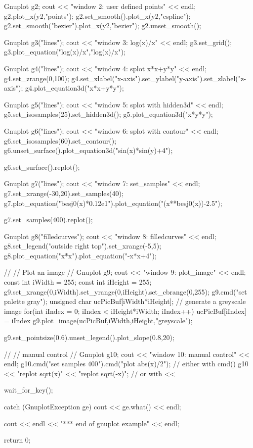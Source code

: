 \begin{DoxyCode}
{{        Gnuplot g2;
        cout << "window 2: user defined points" << endl;
        g2.plot_x(y2,"points");
        g2.set_smooth().plot_x(y2,"cspline");
        g2.set_smooth("bezier").plot_x(y2,"bezier");
        g2.unset_smooth();

        Gnuplot g3("lines");
        cout << "window 3: log(x)/x" << endl;
        g3.set_grid();
        g3.plot_equation("log(x)/x","log(x)/x");

        Gnuplot g4("lines");
        cout << "window 4: splot x*x+y*y" << endl;
        g4.set_zrange(0,100);
        g4.set_xlabel("x-axis").set_ylabel("y-axis").set_zlabel("z-axis");
        g4.plot_equation3d("x*x+y*y");

        Gnuplot g5("lines");
        cout << "window 5: splot with hidden3d" << endl;
        g5.set_isosamples(25).set_hidden3d();
        g5.plot_equation3d("x*y*y");

        Gnuplot g6("lines");
        cout << "window 6: splot with contour" << endl;
        g6.set_isosamples(60).set_contour();
        g6.unset_surface().plot_equation3d("sin(x)*sin(y)+4");

        g6.set_surface().replot();

        Gnuplot g7("lines");
        cout << "window 7: set_samples" << endl;
        g7.set_xrange(-30,20).set_samples(40);
        g7.plot_equation("besj0(x)*0.12e1").plot_equation("(x**besj0(x))-2.5");

        g7.set_samples(400).replot();

        Gnuplot g8("filledcurves");
        cout << "window 8: filledcurves" << endl;
        g8.set_legend("outside right top").set_xrange(-5,5);
        g8.plot_equation("x*x").plot_equation("-x*x+4");

        //
        // Plot an image
        //
        Gnuplot g9;
        cout << "window 9: plot_image" << endl;
        const int iWidth  = 255;
        const int iHeight = 255;
        g9.set_xrange(0,iWidth).set_yrange(0,iHeight).set_cbrange(0,255);
        g9.cmd("set palette gray");
        unsigned char ucPicBuf[iWidth*iHeight];
        // generate a greyscale image
        for(int iIndex = 0; iIndex < iHeight*iWidth; iIndex++)
        {
            ucPicBuf[iIndex] = iIndex%
        }
        g9.plot_image(ucPicBuf,iWidth,iHeight,"greyscale");

        g9.set_pointsize(0.6).unset_legend().plot_slope(0.8,20);

        //
        // manual control
        //
        Gnuplot g10;
        cout << "window 10: manual control" << endl;
        g10.cmd("set samples 400").cmd("plot abs(x)/2"); // either with cmd()
        g10 << "replot sqrt(x)" << "replot sqrt(-x)";    // or with <<

        wait_for_key();

    }
    catch (GnuplotException ge)
    {
        cout << ge.what() << endl;
    }


    cout << endl << "*** end of gnuplot example" << endl;

    return 0;
}
\end{DoxyCode}


